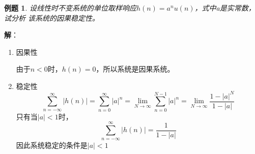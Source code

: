 \documentclass[notheorems,compress,mathserif,table]{beamer}
\newtheorem{example}{例题}
\begin{document}
\begin{frame}\frametitle{}%
\begin{example}

设线性时不变系统的单位取样响应$h(n)=a^{n}u(n)$，式中a是实常数，试分析
该系统的因果稳定性。
\end{example}
\par\textbf{解}：\par
\begin{enumerate}
  \item 因果性
        \par 由于$n<0$时，$h(n)=0$，所以系统是因果系统。\par
  \item 稳定性
           $$\sum_{n=-\infty}^{\infty}|h(n)|= \sum_{n=0}^{\infty}|a|^{n} = \lim_{N\rightarrow\infty}\sum_{n=0}^{N-1}|a|^{n} = \lim_{N\rightarrow\infty}\frac{1-|a|^{N}}{1-|a|}$$
        只有当$|a|<1$时，
           $$\sum_{n=-\infty}^{\infty}|h(n)| = \frac{1}{1-|a|}$$
        因此系统稳定的条件是$|a|<1$
\end{enumerate}

\end{frame}



%
%
%
%
\end{document}

